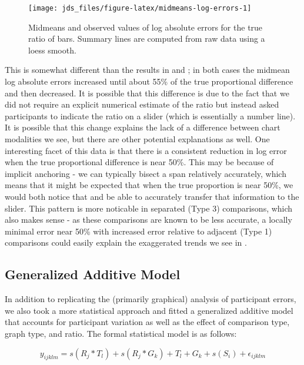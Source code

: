 \documentclass[letterpaper,inpress,dvipsnames]{jdsart}
\begin{document}
\begin{figure}
\texttt{[image: jds\_files/figure-latex/midmeans-log-errors-1]} \caption{Midmeans and observed values of log absolute errors for the true ratio of bars. Summary lines are computed from raw data using a loess smooth.}\label{fig:midmeans-log-errors}
\end{figure}

This is somewhat different than the results in \citet{clevelandGraphical1984} and \citet{heerCrowdsourcingGraphicalPerception2010b}; in both cases the midmean log absolute errors increased until about 55\% of the true proportional difference and then decreased.
It is possible that this difference is due to the fact that we did not require an explicit numerical estimate of the ratio but instead asked participants to indicate the ratio on a slider (which is essentially a number line).
It is possible that this change explains the lack of a difference between chart modalities we see, but there are other potential explanations as well.
One interesting facet of this data is that there is a consistent reduction in log error when the true proportional difference is near 50\%.
This may be because of implicit anchoring - we can typically bisect a span relatively accurately, which means that it might be expected that when the true proportion is near 50\%, we would both notice that and be able to accurately transfer that information to the slider.
This pattern is more noticable in separated (Type 3) comparisons, which also makes sense - as these comparisons are known to be less accurate, a locally minimal error near 50\% with increased error relative to adjacent (Type 1) comparisons could easily explain the exaggerated trends we see in .

\hypertarget{generalized-additive-model}{%
\subsection{Generalized Additive Model}\label{generalized-additive-model}}

In addition to replicating the (primarily graphical) analysis of participant errors, we also took a more statistical approach and fitted a generalized additive model that accounts for participant variation as well as the effect of comparison type, graph type, and ratio. The formal statistical model is as follows:

\[y_{ijklm}= s(R_j * T_l) + s(R_j *G_k) + T_l + G_k + s(S_i) + \epsilon_{ijklm}\]
\end{document}
